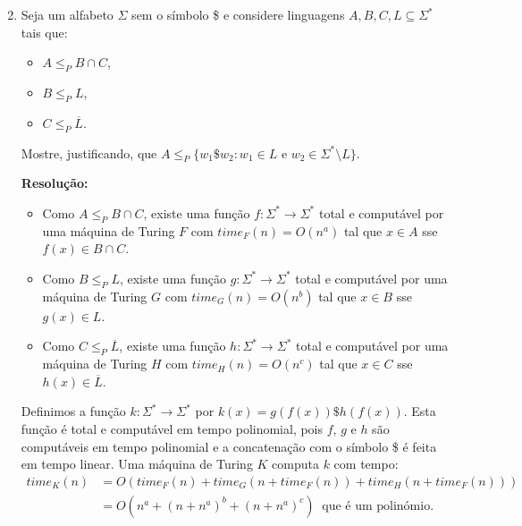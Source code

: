 \documentclass[a4paper,12pt]{article}
\begin{document}
\vspace{1.0cm}
\begin{enumerate}[label=\arabic*)]
  \setcounter{enumi}{1}
  \item Seja um alfabeto $\Sigma$ sem o símbolo \$ e considere linguagens $A, B, C, L \subseteq \Sigma^*$ tais que:
  \begin{itemize}
      \item $A \leq_P B \cap C$,
      \item $B \leq_P L$,
      \item $C \leq_P \overline{L}$.
  \end{itemize}

  \vspace{0.3cm}
  Mostre, justificando, que $A \leq_P \{w_1\$w_2 : w_1 \in L \text{ e } w_2 \in \Sigma^* \setminus L\}$.
  
  \vspace{0.5cm}
  \textbf{Resolução:}
  
  \begin{itemize}
      \item Como $A \leq_P B \cap C$, existe uma função $f:\Sigma^* \to \Sigma^*$ total e computável por uma máquina de Turing $F$ com $time_F(n) = O(n^a)$ tal que $x \in A$ sse $f(x) \in B \cap C$.
      
      \vspace{0.3cm}
      \item Como $B \leq_P L$, existe uma função $g:\Sigma^* \to \Sigma^*$ total e computável por uma máquina de Turing $G$ com $time_G(n) = O(n^b)$ tal que $x \in B$ sse $g(x) \in L$.
      
      \vspace{0.3cm}
      \item Como $C \leq_P \overline{L}$, existe uma função $h:\Sigma^* \to \Sigma^*$ total e computável por uma máquina de Turing $H$ com $time_H(n) = O(n^c)$ tal que $x \in C$ sse $h(x) \in \overline{L}$.
  \end{itemize}

  \vspace{0.3cm}
  Definimos a função $k:\Sigma^* \to \Sigma^*$ por $k(x) = g(f(x))\$h(f(x))$. Esta função é total e computável em tempo polinomial, pois $f$, $g$ e $h$ são computáveis em tempo polinomial e a concatenação com o símbolo \$ é feita em tempo linear. Uma máquina de Turing $K$ computa $k$ com tempo:
  \begin{align*}
      time_K(n) &= O(time_F(n) + time_G(n+time_F(n)) + time_H(n+time_F(n))) \\
      &= O(n^a + (n+n^a)^b + (n+n^a)^c) \ \text{ que é um polinómio. }
  \end{align*}


\end{enumerate}
\end{document}
